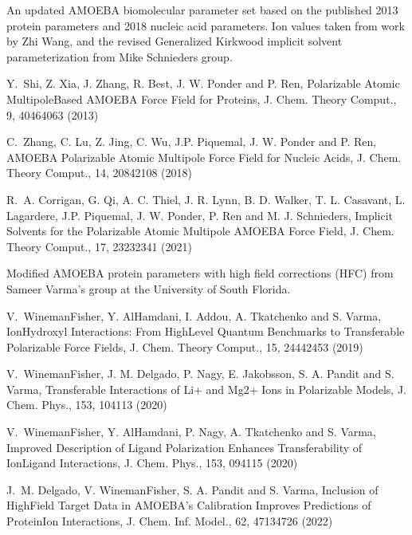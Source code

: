 \documentclass[letterpaper,11pt,english]{sphinxmanual}
\begin{document}
\sphinxAtStartPar
{}

\sphinxAtStartPar
An updated AMOEBA biomolecular parameter set based on the published 2013 protein parameters and 2018 nucleic acid parameters. Ion values taken from work by Zhi Wang, and the revised Generalized Kirkwood implicit solvent parameterization from Mike Schnieders group.

\sphinxAtStartPar
Y. Shi, Z. Xia, J. Zhang, R. Best, J. W. Ponder and P. Ren, Polarizable Atomic Multipole\sphinxhyphen{}Based AMOEBA Force Field for Proteins, J. Chem. Theory Comput., 9, 4046\sphinxhyphen{}4063 (2013)

\sphinxAtStartPar
C. Zhang, C. Lu, Z. Jing, C. Wu, J.\sphinxhyphen{}P. Piquemal, J. W. Ponder and P. Ren, AMOEBA Polarizable Atomic Multipole Force Field for Nucleic Acids, J. Chem. Theory Comput., 14, 2084\sphinxhyphen{}2108 (2018)

\sphinxAtStartPar
R. A. Corrigan, G. Qi, A. C. Thiel, J. R. Lynn, B. D. Walker, T. L. Casavant, L. Lagardere, J.\sphinxhyphen{}P. Piquemal, J. W. Ponder, P. Ren and M. J. Schnieders, Implicit Solvents for the Polarizable Atomic Multipole AMOEBA Force Field, J. Chem. Theory Comput., 17, 2323\sphinxhyphen{}2341 (2021)

\sphinxAtStartPar
{}

\sphinxAtStartPar
Modified AMOEBA protein parameters with high field corrections (HFC) from Sameer Varma’s group at the University of South Florida.

\sphinxAtStartPar
V. Wineman\sphinxhyphen{}Fisher, Y. Al\sphinxhyphen{}Hamdani, I. Addou, A. Tkatchenko and S. Varma, Ion\sphinxhyphen{}Hydroxyl Interactions: From High\sphinxhyphen{}Level Quantum Benchmarks to Transferable Polarizable Force Fields, J. Chem. Theory Comput., 15, 2444\sphinxhyphen{}2453 (2019)

\sphinxAtStartPar
V. Wineman\sphinxhyphen{}Fisher, J. M. Delgado, P. Nagy, E. Jakobsson, S. A. Pandit and S. Varma, Transferable Interactions of Li+ and Mg2+ Ions in Polarizable Models, J. Chem. Phys., 153, 104113 (2020)

\sphinxAtStartPar
V. Wineman\sphinxhyphen{}Fisher, Y. Al\sphinxhyphen{}Hamdani, P. Nagy, A. Tkatchenko and S. Varma, Improved Description of Ligand Polarization Enhances Transferability of Ion\sphinxhyphen{}Ligand Interactions, J. Chem. Phys., 153, 094115 (2020)

\sphinxAtStartPar
J. M. Delgado, V. Wineman\sphinxhyphen{}Fisher, S. A. Pandit and S. Varma, Inclusion of High\sphinxhyphen{}Field Target Data in AMOEBA’s Calibration Improves Predictions of Protein\sphinxhyphen{}Ion Interactions, J. Chem. Inf. Model., 62, 4713\sphinxhyphen{}4726 (2022)
\end{document}

